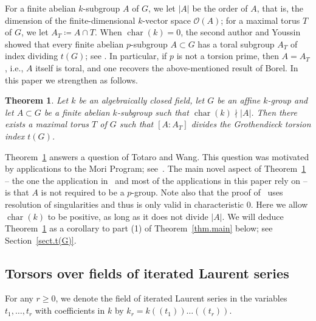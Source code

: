 \documentclass[12pt]{amsart}
\numberwithin{equation}{section}
\newtheorem{theorem}{Theorem}[section]
\theoremstyle{remark}
\newcommand{\Char}{\operatorname{char}}
\begin{document}
For a finite abelian $k$-subgroup $A$ of $G$, we let $|A|$ be the order of $A$, that is, the dimension of the finite-dimensional $k$-vector space $\mathcal{O}(A)$; for a maximal torus $T$ of $G$, we let $A_T\coloneqq A\cap T$. When $\Char(k)=0$, the second author and Youssin showed that every finite abelian $p$-subgroup $A \subset G$ has a toral subgroup $A_T$ of index dividing $t(G)$; see \cite[Theorem 1.1]{reichstein-youssin2}. In particular, if $p$ is not a torsion prime, then $A = A_T$, i.e., $A$ itself is toral, and one recovers the above-mentioned result of Borel. In this paper we strengthen \cite[Theorem 1.1]{reichstein-youssin2} as follows.

\begin{theorem} \label{thm.t(G)} Let $k$ be an algebraically closed field, let $G$ be an affine $k$-group and let $A \subset G$ be a finite abelian $k$-subgroup such that $\Char(k)\nmid |A|$. Then there exists a maximal torus $T$ of $G$ such that $[A:A_T]$ divides the Grothendieck torsion index $t(G)$.
\end{theorem}

Theorem~\ref{thm.t(G)} answers a question of Totaro and Wang. This question was motivated by applications to the Mori Program; see~\cite{wang-jiahe}. The main novel aspect of Theorem~\ref{thm.t(G)} -- the one the application in~\cite{wang-jiahe} and most of the applications in this paper rely on -- is that $A$ is not required to be a $p$-group.  Note also that the proof of~\cite[Theorem 1.1]{reichstein-youssin2} uses resolution of singularities and thus is only valid in characteristic $0$. Here we allow  $\Char(k)$ to be positive, as long as it does not divide $|A|$. We will deduce Theorem~\ref{thm.t(G)} as a corollary to part (1) of Theorem~\ref{thm.main} below; see Section~\ref{sect.t(G)}.


\subsection{Torsors over fields of iterated Laurent series}
For any $r \geqslant 0$, we denote the field of iterated Laurent series in the variables $t_1, \ldots, t_r$ with coefficients in $k$ by  $k_r = k(\!(t_1)\!)\dots (\!(t_r)\!)$. 
\end{document}
